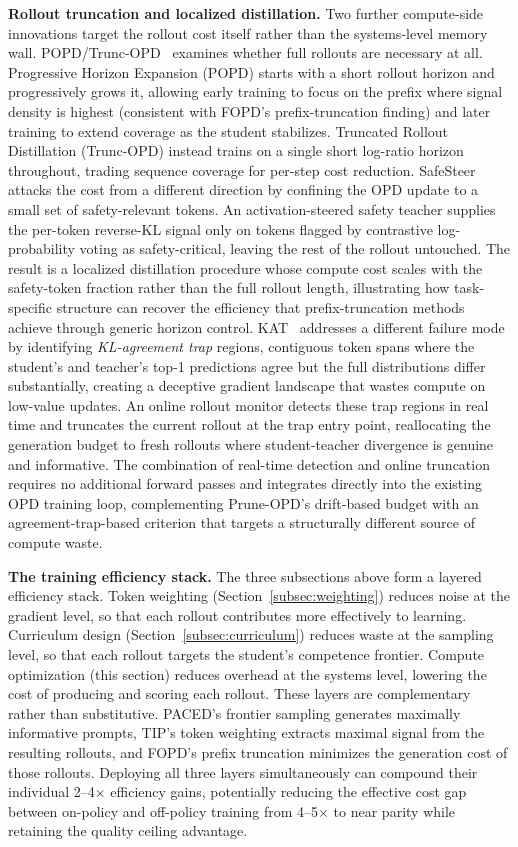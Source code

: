 \documentclass{article} %
\begin{document}
\textbf{Rollout truncation and localized distillation.} Two further compute-side innovations target the rollout cost itself rather than the systems-level memory wall. POPD/Trunc-OPD~\citep{2605.31490} examines whether full rollouts are necessary at all. Progressive Horizon Expansion (POPD) starts with a short rollout horizon and progressively grows it, allowing early training to focus on the prefix where signal density is highest (consistent with FOPD's prefix-truncation finding) and later training to extend coverage as the student stabilizes. Truncated Rollout Distillation (Trunc-OPD) instead trains on a single short log-ratio horizon throughout, trading sequence coverage for per-step cost reduction. SafeSteer~\citep{2606.02530} attacks the cost from a different direction by confining the OPD update to a small set of safety-relevant tokens. An activation-steered safety teacher supplies the per-token reverse-KL signal only on tokens flagged by contrastive log-probability voting as safety-critical, leaving the rest of the rollout untouched. The result is a localized distillation procedure whose compute cost scales with the safety-token fraction rather than the full rollout length, illustrating how task-specific structure can recover the efficiency that prefix-truncation methods achieve through generic horizon control. KAT~\citep{2606.09471} addresses a different failure mode by identifying \emph{KL-agreement trap} regions, contiguous token spans where the student's and teacher's top-1 predictions agree but the full distributions differ substantially, creating a deceptive gradient landscape that wastes compute on low-value updates. An online rollout monitor detects these trap regions in real time and truncates the current rollout at the trap entry point, reallocating the generation budget to fresh rollouts where student-teacher divergence is genuine and informative. The combination of real-time detection and online truncation requires no additional forward passes and integrates directly into the existing OPD training loop, complementing Prune-OPD's drift-based budget with an agreement-trap-based criterion that targets a structurally different source of compute waste.

\textbf{The training efficiency stack.} The three subsections above form a layered efficiency stack. Token weighting (Section~\ref{subsec:weighting}) reduces noise at the gradient level, so that each rollout contributes more effectively to learning. Curriculum design (Section~\ref{subsec:curriculum}) reduces waste at the sampling level, so that each rollout targets the student's competence frontier. Compute optimization (this section) reduces overhead at the systems level, lowering the cost of producing and scoring each rollout. These layers are complementary rather than substitutive. PACED's frontier sampling generates maximally informative prompts, TIP's token weighting extracts maximal signal from the resulting rollouts, and FOPD's prefix truncation minimizes the generation cost of those rollouts. Deploying all three layers simultaneously can compound their individual 2--4$\times$ efficiency gains, potentially reducing the effective cost gap between on-policy and off-policy training from 4--5$\times$ to near parity while retaining the quality ceiling advantage.
\end{document}
